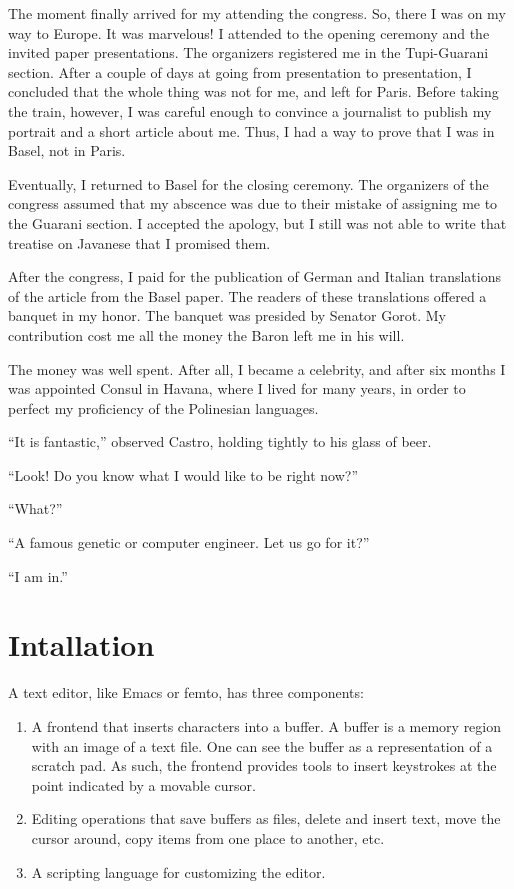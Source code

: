 \documentclass[a4paper,12pt]{book}
\begin{document}
The moment finally arrived for my
attending the congress. So, there
I was on my way to Europe.
It was marvelous! I attended to
the opening ceremony and the invited
paper presentations. The organizers
registered me in the Tupi-Guarani
section. After a couple of days at
going from presentation to presentation,
I concluded that the whole thing was
not for me, and left for Paris.
Before taking the train, however,
I was careful enough to convince a
journalist to publish my portrait
and a short article about me. Thus,
I had a way to prove that I was in
Basel, not in Paris.

Eventually, I returned to Basel for
the closing ceremony. The organizers
of the congress assumed that my
abscence was due to their mistake
of assigning me to the Guarani section.
I accepted the apology, but I still
was not able to write that treatise
on Javanese that I promised them.

After the congress, I paid for the publication
of German and Italian translations of the article
from the Basel paper. The readers of these
translations offered a banquet in my honor.
The banquet was presided by Senator Gorot.
My contribution cost me all the money
the Baron left me in his will.

The money was well spent. After all,
I became a celebrity, and after six
months I was appointed Consul in
Havana, where I lived for many years,
in order to perfect my proficiency
of the Polinesian languages.

``It is fantastic,'' observed Castro, holding
tightly to his glass of beer.

``Look! Do you know what I would like to
be right now?''

``What?''

``A famous genetic or computer engineer. Let us
go for it?''

``I am in.''


\chapter{Intallation}  
A text editor, like Emacs or femto, has three components:
\begin{enumerate}
\item A frontend that inserts characters into a buffer.
A buffer is a memory region with an image of a
text file. One can see the buffer as a representation
of a scratch pad. As such, the frontend provides tools to
insert keystrokes at the  point indicated by 
a movable cursor.
\item Editing operations that save buffers
as files, delete and insert text, move the
cursor around, copy items from one place to another, etc.
\item A scripting language for customizing the editor.
\end{enumerate}
\end{document}
